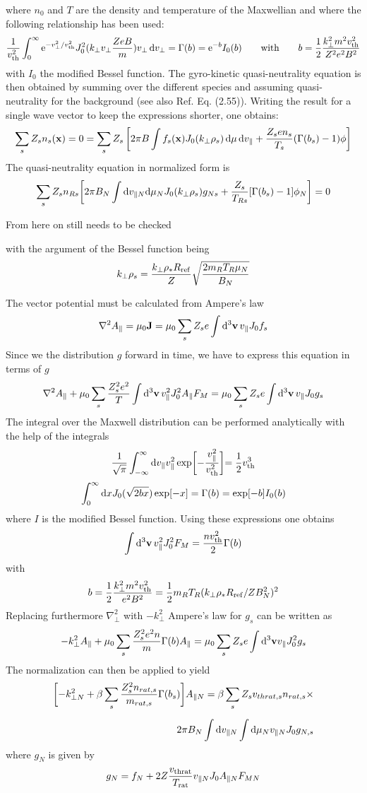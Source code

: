 \documentclass{report}
\def\be{\begin{equation}}
\def\ee{\end{equation}}
\def\bee{\begin{eqnarray}}
\def\eee{\end{eqnarray}}
\def\black{\special     {ps: 0 0 0 setrgbcolor}}
\def\blue{\special      {ps: 0 0 1 setrgbcolor}}
\begin{document}
where $n_0$ and $T$ are the density and temperature of the Maxwellian and where the following relationship has been used:
$$\frac{1}{v_{\rm th}^2}\int_0^\infty \mathrm{e}^{-v_\perp^2/v_{\rm th}^2}J_0^2(k_\perp v_\perp \frac{ZeB}{m}) v_\perp \,\mathrm{d}v_\perp = \Gamma(b)=\textrm{e}^{-b}I_0(b) \qquad \mathrm{with} \qquad b={1
\over 2} {k_\perp^2 m^2 v_{\rm th}^2 \over Z^2e^2 B^2}$$
with $I_0$ the modified Bessel function. The gyro-kinetic quasi-neutrality equation is then obtained by summing over the different species and assuming quasi-neutrality for the background (see also
Ref. \cite{BEER} Eq. (2.55)). Writing the result for a single wave vector to keep the expressions shorter, one obtains:
\be 
\sum_s Z_s n_s(\mathbf{x}) = 0 = \sum_s  Z_s \left[2\pi B \int  f_s(\mathbf{x})J_0(k_\perp\rho_s)\,\mathrm{d}\mu\,\mathrm{d}v_\parallel + {Z_s e n_s \over T_s} ( \Gamma(b_s) - 1)\phi \right] 
\ee 
The quasi-neutrality equation in normalized form is 
\be 
\sum_s  Z_s n_{Rs} \biggl [ 2 \pi B_N \int {\rm d} v_{\parallel N} {\rm d} \mu_N J_0(k_\perp\rho_s) g_{Ns} 
+ {Z_s \over T_{Rs}} [ \Gamma(b_s) -1]\phi_N \biggr ] = 0 
\ee
\blue From here on still needs to be checked \black 
with the argument of the Bessel function being 
\be 
k_\perp \rho_s = { k_\perp \rho_* R_{\rm ref} \over Z} \sqrt{ 2 m_R T_R \mu_N \over B_N}
\ee

The vector potential must be calculated from Ampere's law 
\be 
\nabla^2 A_\parallel = \mu_0 {\bf J} = \mu_0 \sum_s Z_s e \int {\rm d}^3 {\bf v} \, 
v_\parallel J_0 f_s 
\ee 
Since we the distribution $g$ forward in time, we have to express this equation 
in terms of $g$ 
\be 
\nabla^2 A_\parallel + \mu_0 \sum_s {Z_s^2 e^2 \over T} \int {\rm d}^3 {\bf v} \, 
v_\parallel^2 J_0^2 A_\parallel F_M 
 =  \mu_0 \sum_s Z_s e \int {\rm d}^3 {\bf v} \, v_\parallel J_0 g_s  
\ee 
The integral over the Maxwell distribution can be performed analytically with the 
help of the integrals 
\be 
{1 \over \sqrt{\pi}} \int_{-\infty}^\infty {\rm d} v_\parallel  v_\parallel^2 
\exp \biggl [ - {v_\parallel^2 \over v_{\rm th}^2} \biggl ] = {1\over 2} v_{\rm th}^3 
\ee 
\be 
\int_0^\infty {\rm d} x J_0(\sqrt{2 b x}) \exp [ -x ] = \Gamma(b) = \exp [ -b ] I_0(b) 
\ee 
where $I$ is the modified Bessel function. 
Using these expressions one obtains 
\be
\int {\rm d}^3 {\bf v}\, v_\parallel^2 J_0^2 F_M = {n v_{\rm th}^2 \over 2} \Gamma(b)
\ee 
with 
\be 
b = {1 \over 2} {k_\perp^2 m^2 v_{\rm th}^2 \over e^2 B^2} = {1 \over 2} m_R T_R (k_\perp 
\rho_* R_{\rm ref} / Z B_N^2)^2
\ee
Replacing furthermore $\nabla_\perp^2$ with $-k_\perp^2$ Ampere's law for $g_s$ can be 
written as 
\be 
-k_\perp^2 A_\parallel + \mu_0 \sum_s {Z_s^2 e^2 n \over m} \Gamma(b) A_\parallel =
\mu_0 \sum_s Z_s e \int {\rm d}^3 {\bf v} v_\parallel J_0^2 g_s
\ee
The normalization can then be applied to yield 
\bee 
\biggl [ -k_{\perp N}^2 + \beta \sum_s {Z_s^2 n_{rat,s} \over m_{rat,s}} \Gamma(b_s) \biggr ] A_{\parallel N}
= \beta \sum_s Z_s v_{thrat,s} n_{rat,s} \times \cr 
\noalign{\vskip 0.2 truecm} 
2 \pi B_N \int {\rm d} v_{\parallel N} \int {\rm d} \mu_N
v_{\parallel N} J_0 g_{N,s}
\eee
where $g_N$ is given by 
\be 
g_N = f_N + 2 Z {v_{\rm thrat} \over T_{\rm rat}} v_{\parallel N} J_0 A_{\parallel N} F_{MN}
\ee
\end{document}
